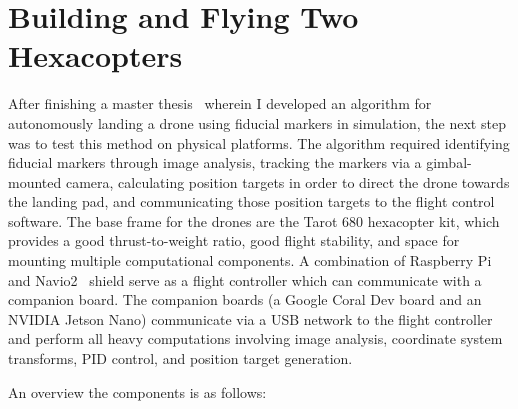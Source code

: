 \section{Building and Flying Two Hexacopters}

After finishing a master thesis~\cite{joshua_master_thesis} wherein I developed an algorithm for autonomously landing a drone using
fiducial markers in simulation, the next step was to test this method on physical platforms.
The algorithm required identifying fiducial markers through image analysis,
tracking the markers via a gimbal-mounted camera,
calculating position targets in order to direct the drone towards the landing pad,
and communicating those position targets to the flight control software.
The base frame for the drones are the Tarot 680 hexacopter kit, which provides a good thrust-to-weight ratio,
good flight stability,
and space for mounting multiple computational components.
A combination of Raspberry Pi and Navio2~\cite{navio2_website} shield serve as a flight controller
which can communicate with a companion board.
The companion boards (a Google Coral Dev board and an NVIDIA Jetson Nano) communicate via a USB network to the flight
controller and perform all heavy computations involving image analysis, coordinate system transforms, PID control,
and position target generation.

An overview the components is as follows:

